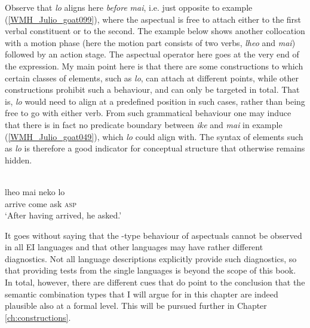 Observe that \textit{lo} aligns here \emph{before} \textit{mai}, i.e. just opposite to example (\ref{WMH_Julio_goat099}), where the aspectual is free to attach either to the first verbal constituent or to the second. The example below shows another collocation with a motion phase (here the motion part consists of two verbs, \textit{lheo} and \textit{mai}) followed by an action stage. The aspectual operator here goes at the very end of the expression. My main point here is that there are some constructions to which certain classes of elements, such as \textit{lo}, can attach at different points, while other constructions prohibit such a behaviour, and can only be targeted in total. That is, \textit{lo} would need to align at a predefined position in such cases, rather than being free to go with either verb. From such grammatical behaviour one may induce that there is in fact no predicate boundary between \textit{ike} and \textit{mai} in example (\ref{WMH_Julio_goat049}), which \textit{lo} could align with. The syntax of elements such as \textit{lo} is therefore a good indicator for conceptual structure that otherwise remains hidden.

\ea \label{WMH_Julio_goat067} 
\\
\gll lheo mai neko lo \\
 arrive come ask \textsc{asp} \\
\glft `After having arrived, he asked.'\\
\z

It goes without saying that the -type behaviour of aspectuals cannot be observed in all EI languages and that other languages may have rather different diagnostics. Not all language descriptions explicitly provide such diagnostics, so that providing tests from the single languages is beyond the scope of this book. In total, however, there are different cues that do point to the conclusion that the semantic combination types that I will argue for in this chapter are indeed plausible also at a formal level. This will be pursued further in Chapter \ref{ch:constructions}.

